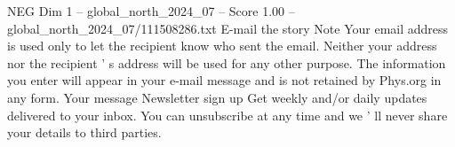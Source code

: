 \begin{textsample}{NEG Dim 1 – global\_north\_2024\_07 – Score 1.00 – global\_north\_2024\_07/111508286.txt}
E-mail the story Note Your email address is used only to let the recipient know who sent the email.
Neither your address nor the recipient ' s address will be used for any other purpose.
The information you enter will appear in your e-mail message and is not retained by Phys.org in any form.
Your message Newsletter sign up Get weekly and/or daily updates delivered to your inbox.
You can unsubscribe at any time and we ' ll never share your details to third parties.

\end{textsample}
